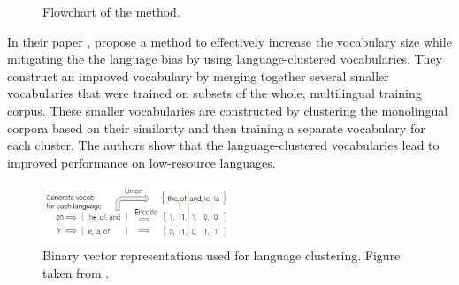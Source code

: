 \begin{figure}[ht]
    \centering
    \caption{Flowchart of the \citet{chung_improving_2020} method.}
    \label{fig:tokenization}
\end{figure}

In their paper  \cite{chung_improving_2020}, \citeauthor{chung_improving_2020} propose a method to effectively increase the vocabulary size while mitigating the the language bias by using language-clustered vocabularies. They construct an improved vocabulary by merging together several smaller vocabularies that were trained on subsets of the whole, multilingual training corpus. These smaller vocabularies are constructed by clustering the monolingual corpora based on their similarity and then training a separate vocabulary for each cluster. The authors show that the language-clustered vocabularies lead to improved performance on low-resource languages.


\begin{figure}[ht]
    \centering
    \includegraphics[width=0.5\textwidth]{img/temp/chung_language_vectors.png}
    \caption{Binary vector representations used for language clustering. Figure taken from \cite{chung_improving_2020}.}
    \label{fig:chung_vectors}
\end{figure}

